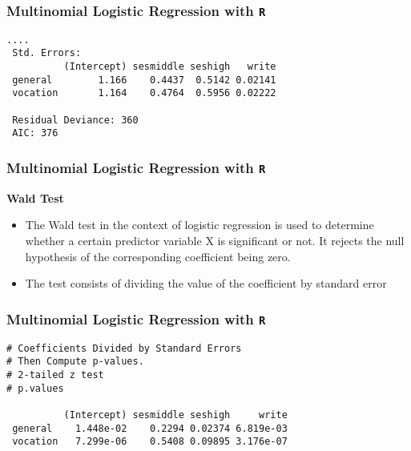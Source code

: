 \documentclass[00-GLMregslides.tex]{subfiles}
\begin{document}
\begin{frame}[fragile]

\frametitle{Multinomial Logistic Regression with \texttt{R}}
\large

\begin{verbatim}
....
 Std. Errors:
          (Intercept) sesmiddle seshigh   write
 general        1.166    0.4437  0.5142 0.02141
 vocation       1.164    0.4764  0.5956 0.02222
 
 Residual Deviance: 360 
 AIC: 376
\end{verbatim}

\end{frame}
%
% 
%
\begin{frame}
\frametitle{Multinomial Logistic Regression with \texttt{R}}
\textbf{Wald Test}

\begin{itemize}
\item The Wald test in the context of logistic regression is used to determine whether a certain predictor variable X  is significant or not. It rejects the null hypothesis of the corresponding coefficient being zero. 

\item The test consists of dividing the value of the coefficient by standard error 
\end{itemize}




\end{frame}
\begin{frame}[fragile]

\frametitle{Multinomial Logistic Regression with \texttt{R}}
\large

\begin{verbatim}
# Coefficients Divided by Standard Errors
# Then Compute p-values.
# 2-tailed z test
# p.values
 
          (Intercept) sesmiddle seshigh     write
 general    1.448e-02    0.2294 0.02374 6.819e-03
 vocation   7.299e-06    0.5408 0.09895 3.176e-07
\end{verbatim}

\end{frame}
\end{document}
